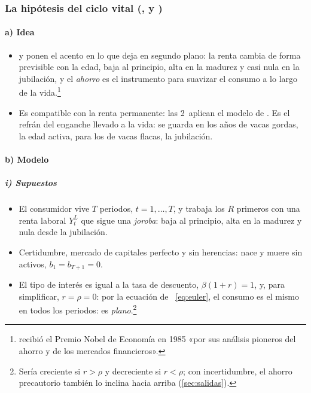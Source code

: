 \documentclass[11pt]{article}
\begin{document}
\subsubsection{La hipótesis del ciclo vital (,  y )}\label{sec:ciclo-vital}

\paragraph{a) Idea}

\begin{itemize}
\item \textcite{ModiglianiBrumberg1954} y \textcite{AndoModigliani1963Life} ponen el acento en lo que  deja en segundo plano: la renta cambia de forma previsible con la edad, baja al principio, alta en la madurez y casi nula en la jubilación, y el \emph{ahorro} es el instrumento para suavizar el consumo a lo largo de la vida.\footnote{ recibió el Premio Nobel de Economía en 1985 «por sus análisis pioneros del ahorro y de los mercados financieros»\nocite{Nobel1985Modigliani}.}
\item Es compatible con la renta permanente: las 2~aplican el modelo de . Es el refrán del enganche llevado a la vida: se guarda en los años de vacas gordas, la edad activa, para los de vacas flacas, la jubilación.
\end{itemize}

\paragraph{b) Modelo}

\subparagraph{i) Supuestos}

\begin{itemize}
\item El consumidor vive $T$ periodos, $t=1,\dots,T$, y trabaja los $R$ primeros con una renta laboral $Y^L_t$ que sigue una \emph{joroba}: baja al principio, alta en la madurez y nula desde la jubilación.
\item Certidumbre, mercado de capitales perfecto y sin herencias: nace y muere sin activos, \mbox{$b_1=b_{T+1}=0$}.
\item El tipo de interés es igual a la tasa de descuento, $\beta(1+r)=1$, y, para simplificar, $r=\rho=0$: por la ecuación de ~\eqref{eq:euler}, el consumo es el mismo en todos los periodos: es \emph{plano}.\footnote{Sería creciente si $r>\rho$ y decreciente si $r<\rho$; con incertidumbre, el ahorro precautorio también lo inclina hacia arriba (\ref{sec:salidas}).}
\end{itemize}
\end{document}
